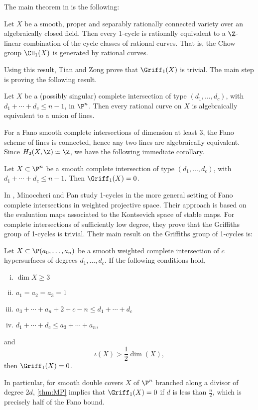 The main theorem in \cite{TZ} is the following:
\begin{theorem}[{\cite[Theorem 1.3]{TZ}}]
\label{thm:TZEquivalentToRationalCurves}
  Let $X$ be a smooth, proper and separably rationally connected variety over an algebraically closed field. Then every 1-cycle is rationally equivalent to a $\Z$-linear combination of the cycle classes of rational curves. That is, the Chow group $\CH_1(X)$ is generated by rational curves.
\end{theorem}
Using this result, Tian and Zong prove that $\Griff_1(X)$ is trivial. The main step is proving the following result.
\begin{theorem}[{\cite[Theorem 6.2]{TZ}}]
\label{thm:TZ}
  Let $X$ be a (possibly singular) complete intersection of type $(d_1,\dots,d_c)$, with $d_1 + \cdots + d_c \leq n-1$, in $\P^n$. Then every rational curve on $X$ is algebraically equivalent to a union of lines.
\end{theorem}
For a Fano smooth complete intersections of dimension at least 3, the Fano scheme of lines is connected, hence any two lines are algebraically equivalent. Since $H_2(X,\Z) \simeq \Z$, we have the following immediate corollary.
\begin{theorem}[{\cite[Remark 6.4]{TZ}}]
  Let $X \subset \P^n$ be a smooth complete intersection of type $(d_1,\dots,d_c)$, with $d_1 + \cdots + d_c \leq n-1$. Then $\Griff_1(X) = 0$.
\end{theorem}

 In \cite{MP}, Minoccheri and Pan study 1-cycles in the more general setting of Fano complete intersections in weighted projective space. Their approach is based on the evaluation maps associated to the Kontsevich space of stable maps. For complete intersections of sufficiently low degree, they prove that the Griffiths group of 1-cycles is trivial. Their main result on the Griffiths group of 1-cycles is:
\begin{theorem}[{\cite[Theorem 2.3]{MP}}]
\label{thm:MP}
  Let $X \subset \P(a_0,\dots,a_n)$ be a smooth weighted complete intersection of $c$ hypersurfaces of degrees $d_1, \dots, d_c$. If the following conditions hold,
  \begin{enumerate}[i)]
  \item $\dim X \geq 3$
  \item $a_1 = a_2 = a_3 = 1$
  \item $a_3 + \cdots + a_n + 2 + c-n \leq d_1 + \cdots + d_c$
  \item $d_1 + \cdots + d_c \leq a_3 + \cdots + a_n$,
  \end{enumerate}
 and 
\[\iota(X) > \frac{1}{2} \dim(X), \]
then $\Griff_1(X) = 0$.
\end{theorem}
In particular, for smooth double covers $X$ of $\P^n$ branched along a divisor of degree $2d$, \cref{thm:MP} implies that $\Griff_1(X) = 0$ if $d$ is less than $\frac{n}{2}$, which is precisely half of the Fano bound.

